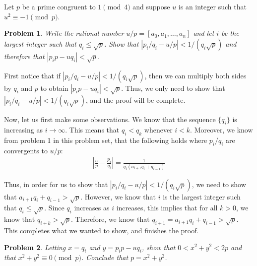 \documentclass[psamsfonts]{amsart}
\newtheorem{prob}{Problem}[section]
\newenvironment{sol}{{\bfseries Solution}}{\qedsymbol}
\theoremstyle{definition}
\theoremstyle{remark}
\numberwithin{equation}{section}
\begin{document}
Let $p$ be a prime congruent to $1 \pmod{4}$ and suppose $u$ is an integer such that $u^2 \equiv -1 \pmod{p}$. 

\begin{prob}
Write the rational number $u/p = [a_0, a_1, \ldots, a_n]$ and let $i$ be the largest integer such that $q_i \leq \sqrt{p}$. Show that $|p_i/q_i - u/p| < 1/(q_i \sqrt{p})$ and therefore that $|p_i p - u q_i | < \sqrt{p}$. 
\end{prob}

\begin{sol}
First notice that if $|p_i/q_i - u/p| < 1/(q_i \sqrt{p})$, then we can multiply both sides by $q_i$ and $p$ to obtain $|p_i p - u q_i | < \sqrt{p}$. Thus, we only need to show that $|p_i/q_i - u/p| < 1/(q_i \sqrt{p})$, and the proof will be complete. 

Now, let us first make some observations. We know that the sequence $\{ q_i \}$ is increasing as $i \to \infty$. This means that $q_i < q_k$ whenever $i < k$. Moreover, we know from problem 1 in this problem set, that the following holds where $p_i/q_i$ are convergents to $u/p$:
\begin{eqnarray}
\left| \frac{u}{p} - \frac{p_i}{q_i} \right| = \frac{1}{q_i ( a_{i+1} q_i + q_{i-1})}
\end{eqnarray}

Thus, in order for us to show that $|p_i/q_i - u/p| < 1/(q_i \sqrt{p})$, we need to show that $a_{i+1} q_i + q_{i-1} > \sqrt{p}$. However, we know that $i$ is the largest integer such that $q_i \leq \sqrt{p}$. Since $q_i$ increases as $i$ increases, this implies that for all $k > 0$, we know that $q_{i+k} > \sqrt{p}$. Therefore, we know that $q_{i+1} = a_{i+1} q_i + q_{i-1} > \sqrt{p}$. This completes what we wanted to show, and finishes the proof.
\end{sol}

\begin{prob}
Letting $x = q_i$ and $y = p_i p - u q_i$, show that $0 < x^2 + y^2 < 2p$ and that $x^2 + y^2 \equiv 0 \pmod{p}$. Conclude that $p = x^2 + y^2$. 
\end{prob}
\end{document}
